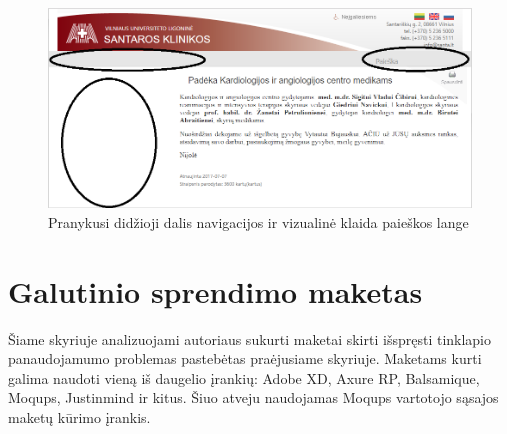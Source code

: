 \documentclass{VUMIFPSkursinis}
\begin{document}
\begin{figure}[H]
    \centering
    \includegraphics[scale=0.55]{img/AtvaizdavimoKlaida}
    \caption{Pranykusi didžioji dalis navigacijos ir vizualinė klaida paieškos lange}
    \label{img:atvaizdavimoklaida}
\end{figure}





\section{Galutinio sprendimo maketas}
Šiame skyriuje analizuojami autoriaus sukurti maketai skirti išspręsti tinklapio panaudojamumo problemas pastebėtas praėjusiame skyriuje. Maketams kurti galima naudoti vieną iš daugelio įrankių: Adobe XD, Axure RP, Balsamique, Moqups, Justinmind ir kitus. Šiuo atveju naudojamas Moqups vartotojo sąsajos maketų kūrimo įrankis.
\end{document}
